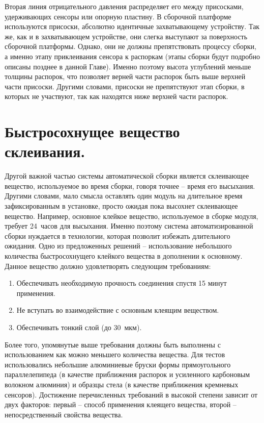 Вторая линия отрицательного давления распределяет его между присосками, удерживающих сенсоры или опорную пластину. В сборочной платформе используются присоски, абсолютно идентичные захватывающему устройству. Так же, как и в захватывающем устройстве, они слегка выступают за поверхность сборочной платформы. Однако, они не должны препятствовать процессу сборки, а именно этапу приклеивания сенсора к распоркам (этапы сборки будут подробно описаны позднее в данной Главе). Именно поэтому высота углублений меньше толщины распорок, что позволяет верней части распорок быть выше верхней части присоски. Другими словами, присоски не препятствуют этап сборки, в которых не участвуют, так как находятся ниже верхней части распорок.

\section{Быстросохнущее вещество склеивания.}

Другой важной частью системы автоматической сборки является склеивающее вещество, используемое во время сборки, говоря точнее -- время его высыхания. Другими словами, мало смысла оставлять один модуль на длительное время зафиксированным в установке, просто ожидая пока высохнет склеивающее вещество. Например, основное клейкое вещество, используемое в сборке модуля, требует 24~часов для высыхания. Именно поэтому система автоматизированной сборки нуждается в технологии, которая позволит избежать длительного ожидания. Одно из предложенных решений -- использование небольшого количества быстросохнущего клейкого вещества в дополнении к основному. Данное вещество должно удовлетворять следующим требованиям:

\begin{enumerate}
\setlength\itemsep{-0.5em}
\item Обеспечивать необходимую прочность соединения спустя 15 минут применения.
\item Не вступать во взаимодействие с основным клеящим веществом.
\item Обеспечивать тонкий слой (до 30~мкм).
\end{enumerate}

Более того, упомянутые выше требования должны быть выполнены с использованием как можно меньшего количества вещества. Для тестов использовались небольшие алюминиевые бруски формы прямоугольного параллелепипеда (в качестве приближения распорок и усиленного карбоновым волокном алюминия) и образцы стела (в качестве приближения кремневых сенсоров). Достижение перечисленных требований в высокой степени зависит от двух факторов: первый -- способ применения клеящего вещества, второй -- непосредственный свойства вещества.


